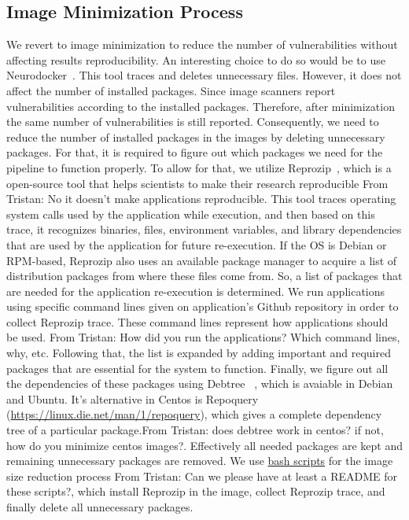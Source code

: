 \documentclass[a4paper,num-refs]{oup-contemporary}
\newcommand{\tristan}[1]{\color{blue}From Tristan: #1\color{black}}
\begin{document}
\subsection{Image Minimization Process}
We revert to image minimization to reduce the number of vulnerabilities without affecting results reproducibility.
An interesting choice to do so would be to use 
Neurodocker~\cite{neurodocker}.
This tool traces and deletes unnecessary files.
However, it does not affect the number of installed packages.
Since image scanners report vulnerabilities according to the installed
packages. Therefore, after
minimization the same number of vulnerabilities is still reported.
Consequently, we need to reduce the number of installed packages
in the images by deleting unnecessary packages. For that, it is required to figure
out which packages we need for the pipeline to function properly. To allow for that, we utilize
Reprozip~\cite{rampin2016reprozip}, which is a open-source tool that
helps scientists to make their research reproducible \tristan{No it doesn't make applications reproducible}. This tool traces operating system calls used by the
application while execution, and then based on this trace, it recognizes binaries, files, environment variables,
and library dependencies that are used by the application for future re-execution. If the OS is
Debian or RPM-based, Reprozip also
uses an available package manager to acquire a list of distribution packages from where these files come from.
So, a list of packages that are needed for the application re-execution is determined. We run applications
using specific command lines given on application's Github repository in order to collect Reprozip trace.
These command lines represent how applications should be used.
\tristan{How did you run the applications? Which command lines, why, etc}. Following that, the list
is expanded by adding important and required packages that are essential
for the system to function. Finally, we figure out all the dependencies of these packages using Debtree
~\cite{debtree}, which is avaiable in Debian and Ubuntu. It's alternative in Centos is Repoquery (\url{https://linux.die.net/man/1/repoquery}), which
gives a complete dependency tree of a particular package.\tristan{does debtree work in centos? if not, how do you minimize centos images?}.
Effectively all needed packages are kept and remaining unnecessary packages are removed. We use
\href{https://github.com/kaurbhupinder/Vulnerability-Analysis/tree/master/Scripts/minification}{bash scripts} for
the image size reduction process \tristan{Can we please have at least a README for these scripts?}, which install Reprozip in the image, collect Reprozip trace, and
finally delete all unnecessary packages.
\end{document}
